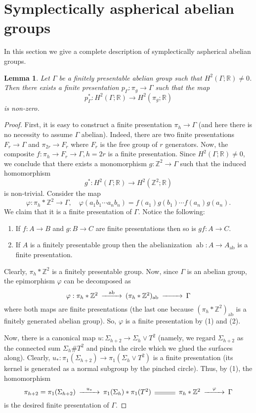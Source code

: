 \documentclass[12pt]{amsart}
\newcommand{\B}[1]{{\mathbb #1}}
\newcommand{\Z}{\B Z}
\newcommand{\R}{\B R}
\newtheorem{lemma}[subsection]{Lemma}
\theoremstyle{definition}
\theoremstyle{remark}
\numberwithin{figure}{section}
\numberwithin{table}{section}
\numberwithin{equation}{section}
\newcommand{\Ga}{{\Gamma}}
\newcommand{\Si}{{\Sigma}}
\newcommand{\gf}{\varphi}
\newcommand\ab{\operatorname{ab}}
\begin{document}


\section{Symplectically aspherical abelian groups}\label{S:sab} 



In this section we give a complete description of symplectically aspherical 
abelian groups.

\begin{lemma}\label{l:epi} 
Let $\Ga $ be a finitely presentable abelian group such that $H^2(\Ga; \R)\neq 
0$. 
Then there exists a finite presentation $p_{\Ga}:\pi_g\to \Ga$ such that the map 
$$
p^*_{\Ga}: H^2(\Ga;\R) \to H^2(\pi_g;\R)
$$
is non-zero.
\end{lemma}

\begin{proof} First, it is easy to construct a finite presentation $\pi_h\to 
\Ga$ (and here there is no necessity to assume $\Ga$ abelian). Indeed, there are 
two finite presentations $F_r\to \Ga$ and $\pi_{2r} \to F_r$ where $F_r$ is the free 
group of $r$ generators. Now, the composite $f:\pi_{h}\to F_r\to \Ga, h=2r$ is a 
finite presentation.
Since $H^2(\Ga; \R)\neq 0$, we conclude that there exists a monomorphism $g: \Z^2\to \Ga$ such that the induced homomorphism  
$$
g^*:H^2(\Ga;\R)\to H^2(\Z^2;\R)
$$
 is non-trivial. Consider the map 
$$
\gf: \pi_{h}*\Z^2 \to \Ga,\quad \gf(a_1b_1\cdots a_nb_n)=f(a_1)g(b_1)\cdots 
f(a_n)g(a_n).
$$
We claim that it is a finite presentation of $\Ga$. Notice the following:
%
\begin{enumerate} 
\item If $f: A \to B$ and $g: B \to C$ are finite presentations then so is $gf: 
A \to C$.
\item If $A$ is a finitely presentable group then the  abelianization $\ab: A \to 
A_{\ab}$ is a finite presentation.
\end{enumerate}

Clearly, $\pi_{h}*\Z^2$ is a finitely presentable group. Now, since $\Ga$ is an 
abelian group, the epimorphism $\gf$ can be decomposed as 
$$
\CD
\gf: \pi_{h}*\Z^2 @>\ab >> (\pi_{h}*\Z^2)_{\ab} @>>> \Ga
\endCD
$$
where both maps are finite presentations (the last one because 
$(\pi_{h}*\Z^2)_{\ab}$ is a finitely generated abelian group). So, $\gf$ is a 
finite presentation by (1) and (2).

Now, there is a canonical map $u: \Si_{h+2}\to \Si_h\vee T^2$ (namely, we regard 
$\Si_{h+2}$ as the connected sum  $\Si_h\# T^2$ and pinch the circle which we 
glued the surfaces along). Clearly, $u_*: \pi_1(\Si_{h+2}) \to \pi_1(\Si_h \vee T^2)$ 
is a finite presentation (its kernel 
is generated as a normal subgroup by the pinched circle). Thus, by (1), the 
homomorphism
$$
\CD
\pi_{h+2}=\pi_1(\Si_{h+2}) @>u_*>> \pi_1(\Si_h)*\pi_1(T^2) @= \pi_h*\Z^2 @>\gf 
>> \Ga
\endCD
$$
is the desired finite presentation of $\Ga$.
\end{proof}
\end{document}
